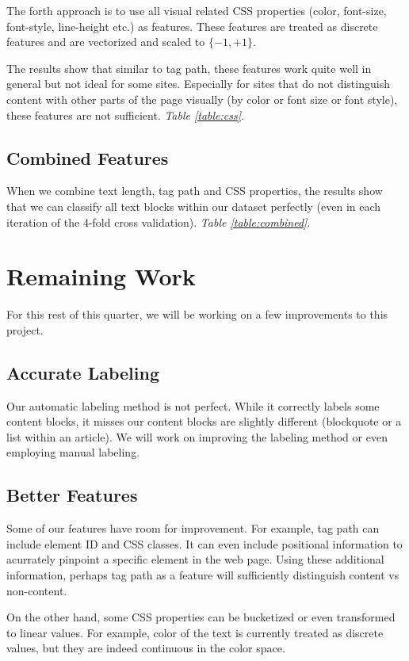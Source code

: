 \documentclass{acm_proc_article-sp}
\begin{document}
The forth approach is to use all visual related CSS properties (color, font-size, font-style, line-height etc.) as features. These features are treated as discrete features and are vectorized and scaled to $\{-1, +1\}$.

The results show that similar to tag path, these features work quite well in general but not ideal for some sites. Especially for sites that do not distinguish content with other parts of the page visually (by color or font size or font style), these features are not sufficient. \emph{Table \ref{table:css}}.

\subsection{Combined Features}

When we combine text length, tag path and CSS properties, the results show that we can classify all text blocks within our dataset perfectly (even in each iteration of the 4-fold cross validation). \emph{Table \ref{table:combined}}.


\section{Remaining Work}

For this rest of this quarter, we will be working on a few improvements to this project.

\subsection{Accurate Labeling}
Our automatic labeling method is not perfect. While it correctly labels some content blocks, it misses our content blocks are slightly different (blockquote or a list within an article). We will work on improving the labeling method or even employing manual labeling.

\subsection{Better Features}
Some of our features have room for improvement. For example, tag path can include element ID and CSS classes. It can even include positional information to acurrately pinpoint a specific element in the web page. Using these additional information, perhaps tag path as a feature will sufficiently distinguish content vs non-content.

On the other hand, some CSS properties can be bucketized or even transformed to linear values. For example, color of the text is currently treated as discrete values, but they are indeed continuous in the color space.
\end{document}
